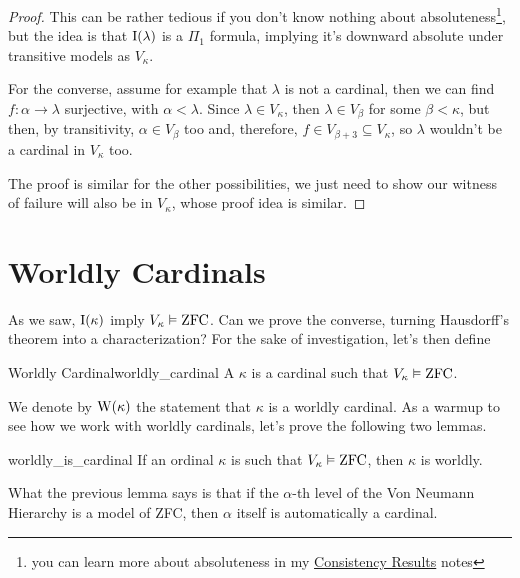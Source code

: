 \begin{proof}
    This can be rather tedious if you don't know nothing about absoluteness\footnote{you can learn more about absoluteness in my \href{https://github.com/Xennonio/Consistency-Results}{Consistency Results} notes}, but the idea is that $\mathrm{I}\!\left(\lambda\right)$ is a $\Pi_1$ formula, implying it's downward absolute under transitive models as $V_\kappa$.

    For the converse, assume for example that $\lambda$ is not a cardinal, then we can find $f:\alpha\to\lambda$ surjective, with $\alpha<\lambda$. Since $\lambda\in V_\kappa$, then $\lambda\in V_\beta$ for some $\beta<\kappa$, but then, by transitivity, $\alpha\in V_\beta$ too and, therefore, $f\in V_{\beta+3}\subseteq V_\kappa$, so $\lambda$ wouldn't be a cardinal in $V_\kappa$ too.

    The proof is similar for the other possibilities, we just need to show our witness of failure will also be in $V_\kappa$, whose proof idea is similar.
\end{proof}

\section{Worldly Cardinals}

As we saw, $\mathrm{I}\!\left(\kappa\right)$ imply $V_\kappa\vDash\mathrm{ZFC}$. Can we prove the converse, turning Hausdorff's theorem into a characterization? For the sake of investigation, let's then define

\begin{definition}{Worldly Cardinal}{worldly_cardinal}
    A  $\kappa$ is a cardinal such that $V_\kappa\vDash\mathrm{ZFC}$.
\end{definition}

We denote by $\mathrm{W}\!\left(\kappa\right)$ the statement that $\kappa$ is a worldly cardinal. As a warmup to see how we work with worldly cardinals, let's prove the following two lemmas.

\begin{lemma}{}{worldly_is_cardinal}
    If an ordinal $\kappa$ is such that $V_\kappa\vDash\mathrm{ZFC}$, then $\kappa$ is worldly.
\end{lemma}

What the previous lemma says is that if the $\alpha$-th level of the Von Neumann Hierarchy is a model of ZFC, then $\alpha$ itself is automatically a cardinal.

